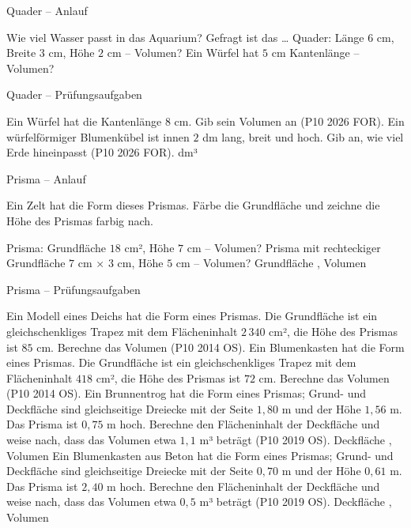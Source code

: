 \begin{aufgabe}{Quader – Anlauf}
\begin{teile}
\teil Wie viel Wasser passt in das Aquarium? Gefragt ist das …  
\teil Quader: Länge $6$ cm, Breite $3$ cm, Höhe $2$ cm – Volumen? \leerfeld[cm³]
\teil Ein Würfel hat $5$ cm Kantenlänge – Volumen? \leerfeld[cm³]
\end{teile}
\end{aufgabe}

\begin{aufgabe}{Quader – Prüfungsaufgaben}
\begin{teile}
\teil Ein Würfel hat die Kantenlänge $8$ cm. Gib sein Volumen an \hfill (P10 2026 FOR). \leerfeld[cm³]
\teil Ein würfelförmiger Blumenkübel ist innen $2$ dm lang, breit und hoch. Gib an, wie viel Erde hineinpasst \hfill (P10 2026 FOR). \leerfeld dm³
\end{teile}
\end{aufgabe}

\begin{aufgabe}{Prisma – Anlauf}
\begin{teile}
\teil Ein Zelt hat die Form dieses Prismas. Färbe die Grundfläche und zeichne die Höhe des Prismas farbig nach.

\teil Prisma: Grundfläche $18$ cm², Höhe $7$ cm – Volumen? \leerfeld[cm³]
\teil Prisma mit rechteckiger Grundfläche $7$ cm × $3$ cm, Höhe $5$ cm – Volumen? Grundfläche \leerfeld[cm²] , Volumen \leerfeld[cm³]
\end{teile}
\end{aufgabe}

\begin{aufgabe}{Prisma – Prüfungsaufgaben}
\begin{teile}
\teil Ein Modell eines Deichs hat die Form eines Prismas. Die Grundfläche ist ein gleichschenkliges Trapez mit dem Flächeninhalt $2\,340$ cm², die Höhe des Prismas ist $85$ cm. Berechne das Volumen \hfill (P10 2014 OS). \leerfeld[cm³]
\teil Ein Blumenkasten hat die Form eines Prismas. Die Grundfläche ist ein gleichschenkliges Trapez mit dem Flächeninhalt $418$ cm², die Höhe des Prismas ist $72$ cm. Berechne das Volumen \hfill (P10 2014 OS). \leerfeld[cm³]
\teil Ein Brunnentrog hat die Form eines Prismas; Grund- und Deckfläche sind gleichseitige Dreiecke mit der Seite $1{,}80$ m und der Höhe $1{,}56$ m. Das Prisma ist $0{,}75$ m hoch. Berechne den Flächeninhalt der Deckfläche und weise nach, dass das Volumen etwa $1{,}1$ m³ beträgt \hfill (P10 2019 OS). Deckfläche \leerfeld[m²] , Volumen \leerfeld[m³]
\teil Ein Blumenkasten aus Beton hat die Form eines Prismas; Grund- und Deckfläche sind gleichseitige Dreiecke mit der Seite $0{,}70$ m und der Höhe $0{,}61$ m. Das Prisma ist $2{,}40$ m hoch. Berechne den Flächeninhalt der Deckfläche und weise nach, dass das Volumen etwa $0{,}5$ m³ beträgt \hfill (P10 2019 OS). Deckfläche \leerfeld[m²] , Volumen \leerfeld[m³]
\end{teile}
\end{aufgabe}

